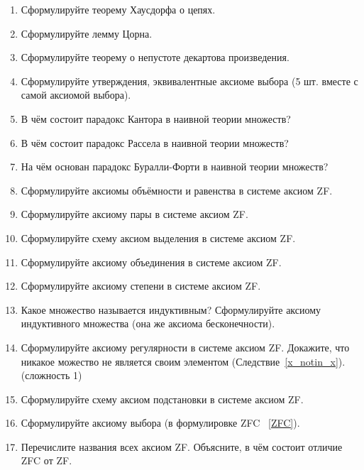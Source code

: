 \documentclass[12pt,oneside]{article}
\theoremstyle{definition}
\begin{document}
\begin{enumerate}
\item Сформулируйте теорему Хаусдорфа о цепях.

\item Сформулируйте лемму Цорна.

\item Сформулируйте теорему о непустоте декартова произведения.

\item Сформулируйте утверждения, эквивалентные аксиоме выбора (5 шт. вместе с самой аксиомой выбора).

\item В чём состоит парадокс Кантора в наивной теории множеств?

\item В чём состоит парадокс Рассела в наивной теории множеств?

\item На чём основан парадокс Буралли-Форти в наивной теории множеств?

\item Сформулируйте аксиомы объёмности и равенства в системе аксиом ZF.

\item Сформулируйте аксиому пары в системе аксиом ZF.

\item Сформулируйте схему аксиом выделения в системе аксиом ZF.

\item Сформулируйте аксиому объединения в системе аксиом ZF.

\item Сформулируйте аксиому степени в системе аксиом ZF.

\item  Какое множество называется индуктивным? Сформулируйте аксиому индуктивного множества (она же аксиома бесконечности).

\item Сформулируйте аксиому регулярности в системе аксиом ZF. Докажите, что никакое можество не является своим элементом (Следствие~\ref{x_notin_x}).(сложность 1)

\item Сформулируйте схему аксиом подстановки в системе аксиом ZF.

\item Сформулируйте аксиому выбора (в формулировке ZFC ~\ref{ZFC}).

\item Перечислите названия всех аксиом ZF. Объясните, в чём состоит отличие ZFC от ZF.


\end{enumerate}
\end{document}
